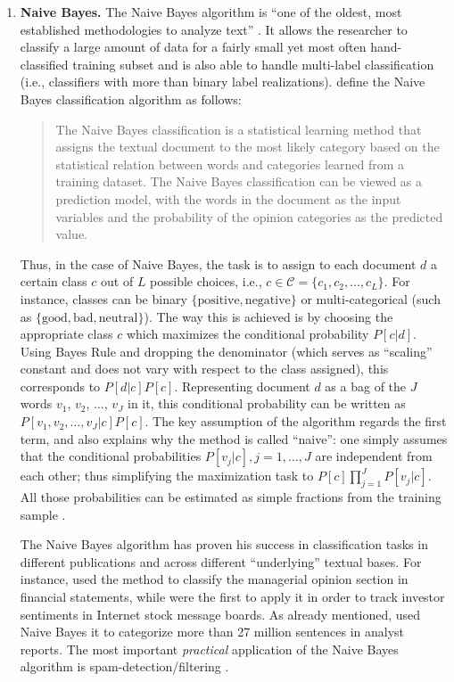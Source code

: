 \begin{enumerate}[(1)]
\item \textbf{Naive Bayes.} The Naive Bayes algorithm is \enquote{one of the oldest, most established methodologies to analyze text} \parencite[1209]{LM-meta-2016}. It allows the researcher to classify a large amount of data for a fairly small yet most often hand-classified training subset and is also able to handle multi-label classification (i.e., classifiers with more than binary label realizations). \textcite{HuangZangZheng14} define the Naive Bayes classification algorithm as follows:
\blockquote{The Naive Bayes classification is a statistical learning method that assigns the textual document to the most likely category based on the statistical relation between words and categories learned from a training dataset. \textelp{} The Naive Bayes classification can be viewed as a prediction model, with the words in the document as the input variables and the probability of the opinion categories as the predicted value.}

Thus, in the case of Naive Bayes, the task is to assign to each document $d$ a certain class $c$ out of $L$ possible choices, i.e., $c \in \mathcal{C} = \{c_1, c_2, \dots, c_L \}$. For instance, classes can be binary  $\{\text{positive}, \text{negative} \}$ or multi-categorical (such as $\{\text{good}, \text{bad}, \text{neutral} \}$). The way this is achieved is by choosing the appropriate class $c$ which maximizes the conditional probability $P[c|d]$. Using Bayes Rule and dropping the denominator (which serves as \enquote{scaling} constant and does not vary with respect to the class assigned), this corresponds to $P[d|c] P[c]$. Representing document $d$ as a bag of the $J$ words $v_1$, $v_2$, $\dots$, $v_J$ in it, this conditional probability can be written as $P[v_1, v_2, \dots, v_J|c] P[c]$. The key assumption of the algorithm regards the first term, and also explains why the method is called \enquote{naive}: one simply assumes that the conditional probabilities $P[v_j|c], j = 1, \dots, J$ are independent from each other; thus simplifying the maximization task to $ P[c] \prod_{j=1}^{J} P[v_j|c] $. All those probabilities can be estimated as simple fractions from the training sample \parencite{Jurafsky_Draft_2017}. 

The Naive Bayes algorithm has proven his success in classification tasks in different publications and across different \enquote{underlying} textual bases. For instance, \textcite{Li2010} used the method to classify the managerial opinion section in financial statements, while \textcite{AntweilerFrank2004} were the first to apply it in order to track investor sentiments in Internet stock message boards. As already mentioned, \textcite{HuangZangZheng14} used Naive Bayes it to categorize more than 27 million sentences in analyst reports. The most important \textit{practical} application of the Naive Bayes algorithm is spam-detection/filtering \parencite{Jurafsky_Draft_2017}. 


\end{enumerate}
